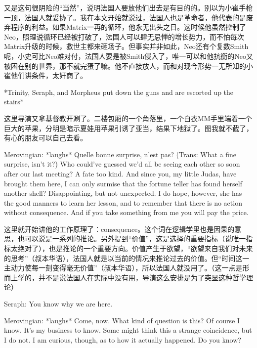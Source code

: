 \documentclass[UTF8]{ctexart}
\newenvironment{myquote}{\color{green} \setlength{\leftskip}{6em} \setlength{\rightskip}{4em} \setlength{\parindent}{-2em}}{\par}
\begin{document}
又是这句很阴险的“当然”，说明法国人要放他们出去是有目的的。别以为小崔手枪一顶，法国人就妥协了。我在本文开始就说过，法国人也是革命者，他代表的是废弃程序的利益。如果Matrix一再的循环，他永无出头之日。这时候他虽然控制了Neo，照理说循环已经被打破了，法国人可以肆无忌惮的增长势力，而不怕每次Matrix升级的时候，救世主都来砸场子。但事实并非如此，Neo还有个复数Smith呢，小史可比Neo难对付，法国人要是被Smith侵入了，唯一可以和他抗衡的Neo又被困在别的世界，那不就完蛋了嘛。他不直接放人，而和对现今形势一无所知的小崔他们讲条件，太奸商了。

\begin{myquote}
*Trinity, Seraph, and Morpheus put down the guns and are escorted up the stairs*
\end{myquote}

这里导演又拿基督教开涮了。二楼包厢的一个角落里，一个白衣MM手里端着一个巨大的苹果，分明是暗示夏娃用苹果引诱了亚当，结果下地狱了。图我就不截了，有心的朋友可以自己去看。

\begin{myquote}
Merovingian: *laughs* Quelle bonne surprise, n'est pas? (Trans: What a fine surprise, isn't it?) Who could've guessed we'd all be seeing each other so soon after our last meeting? A fate too kind. And since you, my little Judas, have brought them here, I can only surmise that the fortune teller has found herself another shell? Disappointing, but not unexpected. I do hope, however, she has the good manners to learn her lesson, and to remember that there is no action without consequence. And if you take something from me you will pay the price.
\end{myquote}

这里就开始讲他的工作原理了：consequence。这个词在逻辑学里也是因果的意思，也可以说是一系列的推论。另外提到“价值”，这是选择的重要指标（说唯一指标太绝对了），也是推论的一个重要方向。价值产生于欲望，“欲望来自我们对未来的思考”（叔本华语），法国人就是以当前的情况来推论过去的价值。但“时间这一主动力使每一刻变得毫无价值”（叔本华语），所以法国人就没用了。（这一点是形而上学的，并不是说法国人在实际中没有用，导演这么安排是为了突显这种哲学理论）

\begin{myquote}
Seraph: You know why we are here.

Merovingian: *laughs* Come, now. What kind of question is this? Of course I know. It's my business to know. Some might think this a strange coincidence, but I do not. I am curious, though, as to how it actually happened. Do you know?
\end{myquote}
\end{document}
